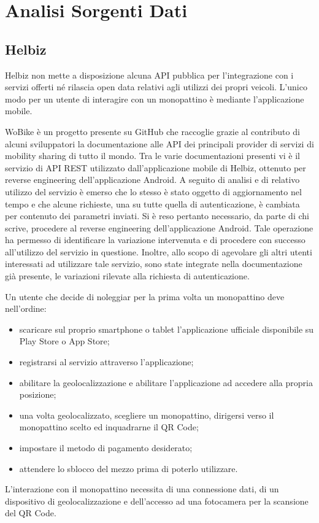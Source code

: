 \chapter{Analisi Sorgenti Dati}

\section{Helbiz}

Helbiz non mette a disposizione alcuna API pubblica per l'integrazione con
i servizi offerti né rilascia open data relativi agli utilizzi dei propri
veicoli. L'unico modo per un utente di interagire con un monopattino è mediante
l'applicazione mobile.

WoBike è un progetto presente su GitHub che raccoglie grazie al contributo
di alcuni sviluppatori la documentazione alle API dei principali 
provider di servizi di mobility sharing di tutto il mondo.
Tra le varie documentazioni presenti vi è il servizio di API REST
utilizzato dall'applicazione mobile di Helbiz, ottenuto per reverse
engineering dell'applicazione Android. A seguito di analisi e di relativo
utilizzo del servizio è emerso che lo stesso è stato oggetto di aggiornamento
nel tempo e che alcune richieste, una su tutte quella di autenticazione,
è cambiata per contenuto dei parametri inviati.
Si è reso pertanto necessario, da parte di chi scrive, procedere al reverse
engineering dell'applicazione Android. Tale operazione ha permesso di
identificare la variazione intervenuta e di procedere con successo
all'utilizzo del servizio in questione. Inoltre, allo scopo di agevolare 
gli altri utenti interessati ad utilizzare tale servizio, sono state integrate
nella documentazione già presente, le variazioni rilevate alla richiesta di
autenticazione.

Un utente che decide di noleggiar per la prima volta un monopattino
deve nell'ordine:
\begin{itemize}
\item scaricare sul proprio smartphone o tablet l'applicazione ufficiale
disponibile su Play Store o App Store;
\item registrarsi al servizio attraverso l'applicazione;
\item abilitare la geolocalizzazione e abilitare l'applicazione ad accedere
alla propria posizione;
\item una volta geolocalizzato, scegliere un monopattino, dirigersi verso
il monopattino scelto ed inquadrarne il QR Code;
\item impostare il metodo di pagamento desiderato;
\item attendere lo sblocco del mezzo prima di poterlo utilizzare.
\end{itemize}
L'interazione con il monopattino necessita di una connessione dati, di
un dispositivo di geolocalizzazione e dell'accesso ad una fotocamera
per la scansione del QR Code.

